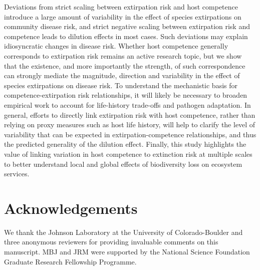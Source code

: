 Deviations from strict scaling between extirpation risk and host competence introduce a large amount of variability in the effect of species extirpations on community disease risk, and strict negative scaling between extirpation risk and competence leads to dilution effects in most cases.
Such deviations may explain idiosyncratic changes in disease risk. Whether host competence generally corresponds to extirpation risk remains an active research topic, but we show that the existence, and more importantly the strength, of such correspondence can strongly mediate the magnitude, direction and variability in the effect of species extirpations on disease risk.
To understand the mechanistic basis for competence-extirpation risk relationships, it will likely be necessary to broaden empirical work to account for life-history trade-offs and pathogen adaptation.
In general, efforts to directly link extirpation risk with host competence, rather than relying on proxy measures such as host life history, will help to clarify the level of variability that can be expected in extirpation-competence relationships, and thus the predicted generality of the dilution effect.
Finally, this study highlights the value of linking variation in host competence to extinction risk at multiple scales to better understand local and global effects of biodiversity loss on ecosystem services.

\section{Acknowledgements}

We thank the Johnson Laboratory at the University of Colorado-Boulder and three anonymous reviewers for providing invaluable comments on this manuscript. MBJ and JRM were supported by the National Science Foundation Graduate Research Fellowship Programme.

